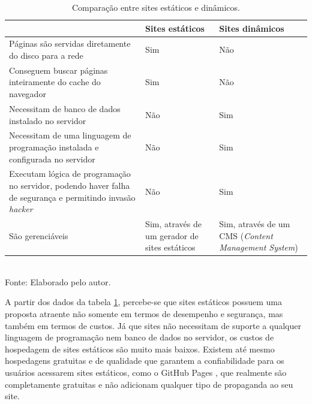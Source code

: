 \documentclass[ppginf, pep]{esinucpel}
\begin{document}
\begin{table}[H]
    \centering
    \caption{Comparação entre sites estáticos e dinâmicos.}
    \vspace{5pt}
    \small
    \begin{tabular}{ | p{7cm} | p{3.5cm} | p{3.5cm} |}
    \hline
    & \textbf{Sites estáticos} & \textbf{Sites dinâmicos} \\ \hline
    Páginas são servidas diretamente do disco para a rede & Sim & Não \\ \hline
    Conseguem buscar páginas inteiramente do cache do navegador & Sim & Não \\ \hline
    Necessitam de banco de dados instalado no servidor & Não & Sim \\ \hline
    Necessitam de uma linguagem de programação instalada e configurada no servidor & Não & Sim \\ \hline
    Executam lógica de programação no servidor, podendo haver falha de segurança e permitindo invasão \textit{hacker} & Não & Sim \\ \hline
    São gerenciáveis & Sim, através de um gerador de sites estáticos & Sim, através de um CMS (\textit{Content Management System}) \\ \hline
    
    \end{tabular}
    \normalsize
    \vspace{5pt}
    \\Fonte: Elaborado pelo autor.
    \label{table:comparacao_sites}
\end{table}

A partir dos dados da tabela \ref{table:comparacao_sites}, percebe-se que sites estáticos possuem uma proposta atraente não somente em termos de desempenho e segurança, mas também em termos de custos. Já que sites não necessitam de suporte a qualquer linguagem de programação nem banco de dados no servidor, os custos de hospedagem de sites estáticos são muito mais baixos. Existem até mesmo hospedagens gratuitas e de qualidade que garantem a confiabilidade para os usuários acessarem sites estáticos, como o GitHub Pages \cite{github_pages}, que realmente são completamente gratuitas e não adicionam qualquer tipo de propaganda ao seu site.
\end{document}

